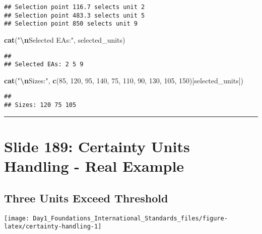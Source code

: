 \documentclass[
]{article}
\newenvironment{Shaded}{\begin{snugshade}}{\end{snugshade}}
\newcommand{\DecValTok}[1]{\textcolor[rgb]{0.00,0.00,0.81}{#1}}
\newcommand{\FunctionTok}[1]{\textcolor[rgb]{0.13,0.29,0.53}{\textbf{#1}}}
\newcommand{\NormalTok}[1]{#1}
\newcommand{\SpecialCharTok}[1]{\textcolor[rgb]{0.81,0.36,0.00}{\textbf{#1}}}
\newcommand{\StringTok}[1]{\textcolor[rgb]{0.31,0.60,0.02}{#1}}
\begin{document}
\begin{verbatim}
## Selection point 116.7 selects unit 2 
## Selection point 483.3 selects unit 5 
## Selection point 850 selects unit 9
\end{verbatim}

\begin{Shaded}
\begin{Highlighting}[]
\FunctionTok{cat}\NormalTok{(}\StringTok{"}\SpecialCharTok{\textbackslash{}n}\StringTok{Selected EAs:"}\NormalTok{, selected\_units)}
\end{Highlighting}
\end{Shaded}

\begin{verbatim}
## 
## Selected EAs: 2 5 9
\end{verbatim}

\begin{Shaded}
\begin{Highlighting}[]
\FunctionTok{cat}\NormalTok{(}\StringTok{"}\SpecialCharTok{\textbackslash{}n}\StringTok{Sizes:"}\NormalTok{, }\FunctionTok{c}\NormalTok{(}\DecValTok{85}\NormalTok{, }\DecValTok{120}\NormalTok{, }\DecValTok{95}\NormalTok{, }\DecValTok{140}\NormalTok{, }\DecValTok{75}\NormalTok{, }\DecValTok{110}\NormalTok{, }\DecValTok{90}\NormalTok{, }\DecValTok{130}\NormalTok{, }\DecValTok{105}\NormalTok{, }\DecValTok{150}\NormalTok{)[selected\_units])}
\end{Highlighting}
\end{Shaded}

\begin{verbatim}
## 
## Sizes: 120 75 105
\end{verbatim}

\begin{center}\rule{0.5\linewidth}{0.5pt}\end{center}

\section{Slide 189: Certainty Units Handling - Real
Example}\label{slide-189-certainty-units-handling---real-example}

\subsection{Three Units Exceed
Threshold}\label{three-units-exceed-threshold}

\texttt{[image: Day1\_Foundations\_International\_Standards\_files/figure-latex/certainty-handling-1]}
\end{document}
